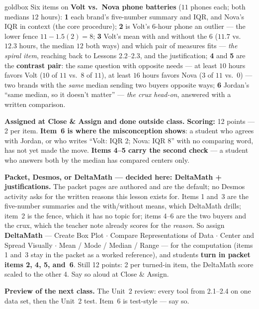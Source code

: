 \documentclass[10pt]{article}
\begin{document}
\boxguard
\begin{skillbox}{goldbox}
Six items on \textbf{Volt vs.\ Nova phone batteries} ($11$ phones each; both medians $12$
hours): \textbf{1} each brand's five-number summary and IQR, and Nova's IQR in context (the
core procedure); \textbf{2} is Volt's $6$-hour phone an outlier --- the lower fence $11 -
1.5(2) = 8$; \textbf{3} Volt's mean with and without the $6$ ($11.7$ vs.\ $12.3$ hours, the
median $12$ both ways) and which pair of measures fits --- \emph{the spiral item}, reaching
back to Lessons 2.2--2.3, and the justification; \textbf{4} and \textbf{5} are the
\textbf{contrast pair}: the same question with opposite needs --- at least $10$ hours favors
Volt ($10$ of $11$ vs.\ $8$ of $11$), at least $16$ hours favors Nova ($3$ of $11$ vs.\ $0$)
--- two brands with the \emph{same} median sending two buyers opposite ways; \textbf{6}
Jordan's ``same median, so it doesn't matter'' --- \emph{the crux head-on}, answered with a
written comparison.

\textbf{Assigned at Close \& Assign and done outside class.} \textbf{Scoring:} 12 points --- 2
per item. \textbf{Item~6 is where the misconception shows}: a student who agrees with Jordan,
or who writes ``Volt: IQR 2; Nova: IQR 8'' with no comparing word, has not yet made the move.
\textbf{Items 4--5 carry the second check} --- a student who answers both by the median has
compared centers only.

\textbf{Packet, Desmos, or DeltaMath --- decided here: DeltaMath + justifications.} The packet
pages are authored and are the default; no Desmos activity asks for the written reasons this
lesson exists for. Items 1 and~3 are the five-number summaries and the with/without means, which
DeltaMath drills; item~2 is the fence, which it has no topic for; items 4--6 are the two buyers
and the crux, which the teacher note already scores for the \emph{reason}. So assign
\textbf{DeltaMath} --- Create Box Plot $\cdot$ Compare Representations of Data $\cdot$ Center
and Spread Visually $\cdot$ Mean / Mode / Median / Range --- for the computation (items 1 and~3
stay in the packet as a worked reference), and students \textbf{turn in packet items 2, 4, 5,
and~6}. Still 12 points: 2 per turned-in item, the DeltaMath score scaled to the other 4. Say so aloud at Close \& Assign.

\textbf{Preview of the next class.} The Unit~2 review: every tool from 2.1--2.4 on one data
set, then the Unit~2 test. Item~6 is test-style --- say so.


\end{skillbox}
\end{document}

